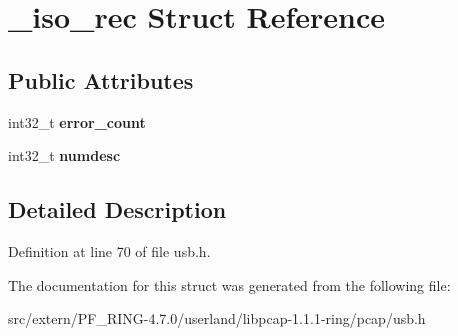 \hypertarget{struct__iso__rec}{
\section{\_\-iso\_\-rec Struct Reference}
\label{struct__iso__rec}
}
\subsection*{Public Attributes}
\begin{DoxyCompactItemize}
\item 
\hypertarget{struct__iso__rec_a058828ab0f82eac772f97503dcd81218}{
int32\_\-t {\bfseries error\_\-count}}
\label{struct__iso__rec_a058828ab0f82eac772f97503dcd81218}

\item 
\hypertarget{struct__iso__rec_a0dfd4f7cba08212f4a1230b5a479578e}{
int32\_\-t {\bfseries numdesc}}
\label{struct__iso__rec_a0dfd4f7cba08212f4a1230b5a479578e}

\end{DoxyCompactItemize}


\subsection{Detailed Description}


Definition at line 70 of file usb.h.



The documentation for this struct was generated from the following file:\begin{DoxyCompactItemize}
\item 
src/extern/PF\_\-RING-\/4.7.0/userland/libpcap-\/1.1.1-\/ring/pcap/usb.h\end{DoxyCompactItemize}
